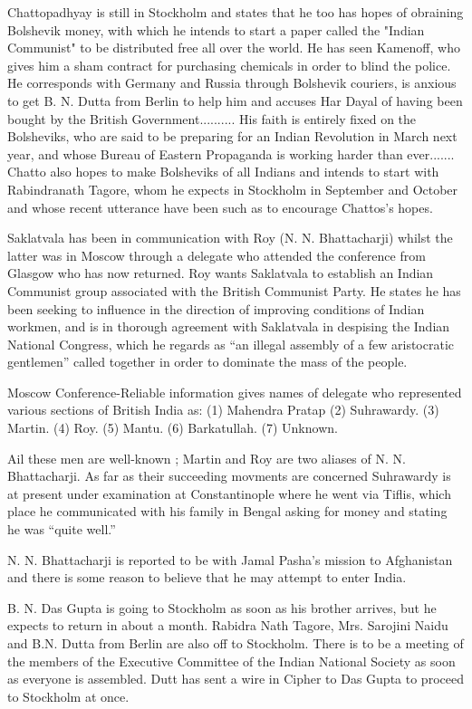 Chattopadhyay is still in Stockholm and states that he too has hopes of obraining Bolshevik money, with which he intends to start a paper called the "Indian Communist" to be distributed free all over the world. He has seen Kamenoff, who gives him a sham contract for purchasing chemicals in order to blind the police. He corresponds with Germany and Russia through Bolshevik couriers, is anxious to get B. N. Dutta from Berlin to help him and accuses Har Dayal of having been bought by the British Government.......... His faith is entirely fixed on the Bolsheviks, who are said to be preparing for an Indian Revolution in March next year, and whose Bureau of Eastern Propaganda is working harder than ever....... Chatto also hopes to make Bolsheviks of all Indians and intends to start with Rabindranath Tagore, whom 
he expects in Stockholm in September and October and whose recent utterance have been such as to encourage Chattos’s hopes. 

Saklatvala has been in communication with Roy (N. N. Bhattacharji) whilst the latter was in Moscow through a delegate who attended the conference from Glasgow who has now returned. Roy wants Saklatvala to establish an Indian Communist group associated with the British Communist
Party. He states he has been seeking to influence in the direction of improving conditions of Indian workmen, and is in thorough agreement with Saklatvala in despising the Indian National Congress, which he regards as “an illegal assembly of a few aristocratic gentlemen” called together in order to dominate the mass of the people. 

Moscow Conference-Reliable information gives names of delegate who represented various sections of British India as: 
(1) Mahendra Pratap  
(2) Suhrawardy.  
(3) Martin.
(4) Roy.
(5) Mantu.
(6) Barkatullah. 
(7) Unknown. 

Ail these men are well-known ; Martin and Roy are two aliases of N. N. Bhattacharji. As far as their succeeding movments are concerned Suhrawardy is at present under examination at Constantinople where he went via Tiflis, which place he communicated with his family in Bengal asking for money and stating he was “quite well.” 

N. N. Bhattacharji is reported to be with Jamal Pasha’s mission to Afghanistan and there is some reason to believe that he may attempt to enter India. 

B. N. Das Gupta is going to Stockholm as soon as his brother arrives, but he expects to return in about a month. Rabidra Nath Tagore, Mrs. Sarojini Naidu and B.N. Dutta from Berlin are also off to Stockholm. There is to be a meeting of the members of the Executive Committee of the Indian National Society as soon as everyone is assembled. Dutt has sent a wire in Cipher to Das Gupta to proceed to Stockholm at once. 

